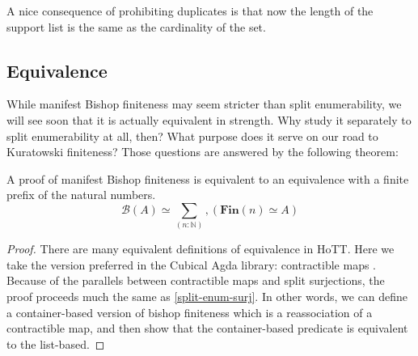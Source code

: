A nice consequence of prohibiting duplicates is that now the length of the
support list is the same as the cardinality of the set.
\subsection{Equivalence}
While manifest Bishop finiteness may seem stricter than split enumerability, we
will see soon that it is actually equivalent in strength.
Why study it separately to split enumerability at all, then?
What purpose does it serve on our road to Kuratowski finiteness?
Those questions are answered by the following theorem:
\begin{lemma} \label{bishop-equiv}
  A proof of manifest Bishop finiteness is equivalent to an equivalence with a
  finite prefix of the natural numbers.
  \begin{equation}
    \mathcal{B}(A) \simeq \sum_{(n : \mathbb{N})} , \left( \mathbf{Fin}(n) \simeq A \right)
  \end{equation}
\end{lemma}
\begin{proof}
  There are many equivalent definitions of equivalence in HoTT.
  Here we take the version preferred in the Cubical Agda library: contractible
  maps \cite{hottbook}.
  Because of the parallels between contractible maps and split surjections,
  the proof proceeds much the same as \ref{split-enum-surj}.
  In other words, we can define a container-based version of bishop finiteness
  which is a reassociation of a contractible map, and then show that the
  container-based predicate is equivalent to the list-based.
\end{proof}
